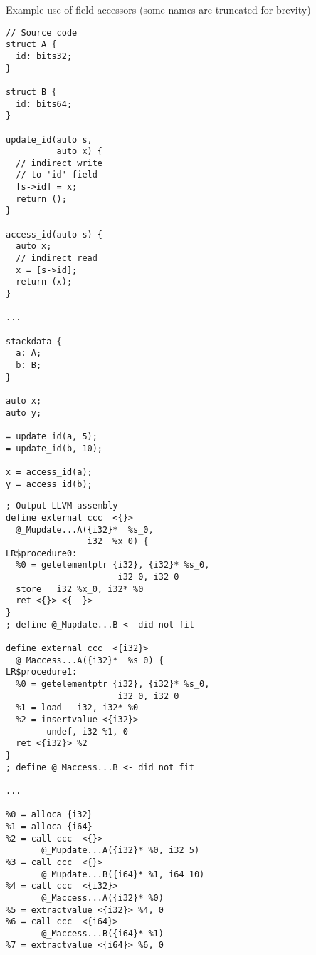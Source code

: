 \begin{codex}
    \caption{Example use of field accessors (some names are truncated for brevity)}
    \label{lst:fieldAccessors}
    \begin{center}
    \begin{minipage}{0.45\linewidth}
    \begin{lstlisting}[basicstyle=\footnotesize\ttfamily]
// Source code
struct A {
  id: bits32;
}

struct B {
  id: bits64;
}

update_id(auto s,
          auto x) {
  // indirect write
  // to 'id' field
  [s->id] = x;
  return ();
}

access_id(auto s) {
  auto x;
  // indirect read
  x = [s->id];
  return (x);
}

...

stackdata {
  a: A;
  b: B;
}

auto x;
auto y;

= update_id(a, 5);
= update_id(b, 10);

x = access_id(a);
y = access_id(b);
    \end{lstlisting}
    \end{minipage}%
    \begin{minipage}{0.55\linewidth}
    \begin{lstlisting}[style=llvmStyle,basicstyle=\scriptsize\ttfamily]
; Output LLVM assembly
define external ccc  <{}>
  @_Mupdate...A({i32}*  %s_0,
                i32  %x_0) {
LR$procedure0:
  %0 = getelementptr {i32}, {i32}* %s_0,
                      i32 0, i32 0
  store   i32 %x_0, i32* %0
  ret <{}> <{  }>
}
; define @_Mupdate...B <- did not fit

define external ccc  <{i32}>
  @_Maccess...A({i32}*  %s_0) {
LR$procedure1:
  %0 = getelementptr {i32}, {i32}* %s_0,
                      i32 0, i32 0
  %1 = load   i32, i32* %0
  %2 = insertvalue <{i32}>
        undef, i32 %1, 0
  ret <{i32}> %2
}
; define @_Maccess...B <- did not fit

...

%0 = alloca {i32}
%1 = alloca {i64}
%2 = call ccc  <{}>
       @_Mupdate...A({i32}* %0, i32 5)
%3 = call ccc  <{}>
       @_Mupdate...B({i64}* %1, i64 10)
%4 = call ccc  <{i32}>
       @_Maccess...A({i32}* %0)
%5 = extractvalue <{i32}> %4, 0
%6 = call ccc  <{i64}>
       @_Maccess...B({i64}* %1)
%7 = extractvalue <{i64}> %6, 0

    \end{lstlisting}
    \end{minipage}
    \end{center}
\end{codex}

